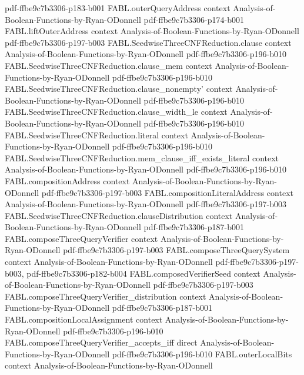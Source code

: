 \begin{theorem}
  {pdf-ffbe9c7b3306-p183-b001}
\proofstep
  {FABL.outerQueryAddress}
  {context}
  {Analysis-of-Boolean-Functions-by-Ryan-ODonnell}
  {pdf-ffbe9c7b3306-p174-b001}
\proofstep
  {FABL.liftOuterAddress}
  {context}
  {Analysis-of-Boolean-Functions-by-Ryan-ODonnell}
  {pdf-ffbe9c7b3306-p197-b003}
\proofstep
  {FABL.SeedwiseThreeCNFReduction.clause}
  {context}
  {Analysis-of-Boolean-Functions-by-Ryan-ODonnell}
  {pdf-ffbe9c7b3306-p196-b010}
\proofstep
  {FABL.SeedwiseThreeCNFReduction.clause_mem}
  {context}
  {Analysis-of-Boolean-Functions-by-Ryan-ODonnell}
  {pdf-ffbe9c7b3306-p196-b010}
\proofstep
  {FABL.SeedwiseThreeCNFReduction.clause_nonempty'}
  {context}
  {Analysis-of-Boolean-Functions-by-Ryan-ODonnell}
  {pdf-ffbe9c7b3306-p196-b010}
\proofstep
  {FABL.SeedwiseThreeCNFReduction.clause_width_le}
  {context}
  {Analysis-of-Boolean-Functions-by-Ryan-ODonnell}
  {pdf-ffbe9c7b3306-p196-b010}
\proofstep
  {FABL.SeedwiseThreeCNFReduction.literal}
  {context}
  {Analysis-of-Boolean-Functions-by-Ryan-ODonnell}
  {pdf-ffbe9c7b3306-p196-b010}
\proofstep
  {FABL.SeedwiseThreeCNFReduction.mem_clause_iff_exists_literal}
  {context}
  {Analysis-of-Boolean-Functions-by-Ryan-ODonnell}
  {pdf-ffbe9c7b3306-p196-b010}
\proofstep
  {FABL.compositionAddress}
  {context}
  {Analysis-of-Boolean-Functions-by-Ryan-ODonnell}
  {pdf-ffbe9c7b3306-p197-b003}
\proofstep
  {FABL.compositionLiteralAddress}
  {context}
  {Analysis-of-Boolean-Functions-by-Ryan-ODonnell}
  {pdf-ffbe9c7b3306-p197-b003}
\proofstep
  {FABL.SeedwiseThreeCNFReduction.clauseDistribution}
  {context}
  {Analysis-of-Boolean-Functions-by-Ryan-ODonnell}
  {pdf-ffbe9c7b3306-p187-b001}
\proofstep
  {FABL.composeThreeQueryVerifier}
  {context}
  {Analysis-of-Boolean-Functions-by-Ryan-ODonnell}
  {pdf-ffbe9c7b3306-p197-b003}
\proofstep
  {FABL.composeThreeQuerySystem}
  {context}
  {Analysis-of-Boolean-Functions-by-Ryan-ODonnell}
  {pdf-ffbe9c7b3306-p197-b003,
    pdf-ffbe9c7b3306-p182-b004}
\proofstep
  {FABL.composedVerifierSeed}
  {context}
  {Analysis-of-Boolean-Functions-by-Ryan-ODonnell}
  {pdf-ffbe9c7b3306-p197-b003}
\proofstep
  {FABL.composeThreeQueryVerifier_distribution}
  {context}
  {Analysis-of-Boolean-Functions-by-Ryan-ODonnell}
  {pdf-ffbe9c7b3306-p187-b001}
\proofstep
  {FABL.compositionLocalAssignment}
  {context}
  {Analysis-of-Boolean-Functions-by-Ryan-ODonnell}
  {pdf-ffbe9c7b3306-p196-b010}
\proofstep
  {FABL.composeThreeQueryVerifier_accepts_iff}
  {direct}
  {Analysis-of-Boolean-Functions-by-Ryan-ODonnell}
  {pdf-ffbe9c7b3306-p196-b010}
\proofstep
  {FABL.outerLocalBits}
  {context}
  {Analysis-of-Boolean-Functions-by-Ryan-ODonnell}

\end{theorem}
